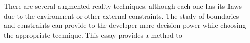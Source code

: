 There are several augmented reality techniques, although each one has its flaws due to the environment or other external constraints. The study of boundaries and constraints can provide to the developer more decision power while choosing the appropriate technique. This essay provides a method to